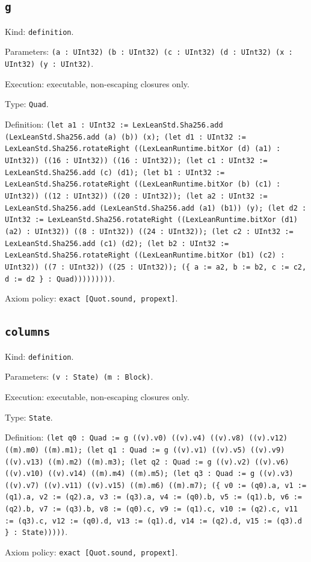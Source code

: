\documentclass[11pt]{article}
\begin{document}
\subsection*{\texttt{g}}
\noindent Kind: \texttt{definition}.\par
\noindent Parameters: \texttt{(a : UInt32) (b : UInt32) (c : UInt32) (d : UInt32) (x : UInt32) (y : UInt32)}.\par
\noindent Execution: executable, non-escaping closures only.\par
\noindent Type: \texttt{Quad}.\par
\noindent Definition: \texttt{(let a1 : UInt32 := LexLeanStd.Sha256.add (LexLeanStd.Sha256.add (a) (b)) (x); (let d1 : UInt32 := LexLeanStd.Sha256.rotateRight ((LexLeanRuntime.bitXor (d) (a1) : UInt32)) ((16 : UInt32)) ((16 : UInt32)); (let c1 : UInt32 := LexLeanStd.Sha256.add (c) (d1); (let b1 : UInt32 := LexLeanStd.Sha256.rotateRight ((LexLeanRuntime.bitXor (b) (c1) : UInt32)) ((12 : UInt32)) ((20 : UInt32)); (let a2 : UInt32 := LexLeanStd.Sha256.add (LexLeanStd.Sha256.add (a1) (b1)) (y); (let d2 : UInt32 := LexLeanStd.Sha256.rotateRight ((LexLeanRuntime.bitXor (d1) (a2) : UInt32)) ((8 : UInt32)) ((24 : UInt32)); (let c2 : UInt32 := LexLeanStd.Sha256.add (c1) (d2); (let b2 : UInt32 := LexLeanStd.Sha256.rotateRight ((LexLeanRuntime.bitXor (b1) (c2) : UInt32)) ((7 : UInt32)) ((25 : UInt32)); (\{ a := a2, b := b2, c := c2, d := d2 \} : Quad)))))))))}.\par
\noindent Axiom policy: \texttt{exact [Quot.sound, propext]}.\par
\subsection*{\texttt{columns}}
\noindent Kind: \texttt{definition}.\par
\noindent Parameters: \texttt{(v : State) (m : Block)}.\par
\noindent Execution: executable, non-escaping closures only.\par
\noindent Type: \texttt{State}.\par
\noindent Definition: \texttt{(let q0 : Quad := g ((v).v0) ((v).v4) ((v).v8) ((v).v12) ((m).m0) ((m).m1); (let q1 : Quad := g ((v).v1) ((v).v5) ((v).v9) ((v).v13) ((m).m2) ((m).m3); (let q2 : Quad := g ((v).v2) ((v).v6) ((v).v10) ((v).v14) ((m).m4) ((m).m5); (let q3 : Quad := g ((v).v3) ((v).v7) ((v).v11) ((v).v15) ((m).m6) ((m).m7); (\{ v0 := (q0).a, v1 := (q1).a, v2 := (q2).a, v3 := (q3).a, v4 := (q0).b, v5 := (q1).b, v6 := (q2).b, v7 := (q3).b, v8 := (q0).c, v9 := (q1).c, v10 := (q2).c, v11 := (q3).c, v12 := (q0).d, v13 := (q1).d, v14 := (q2).d, v15 := (q3).d \} : State)))))}.\par
\noindent Axiom policy: \texttt{exact [Quot.sound, propext]}.\par
\end{document}
